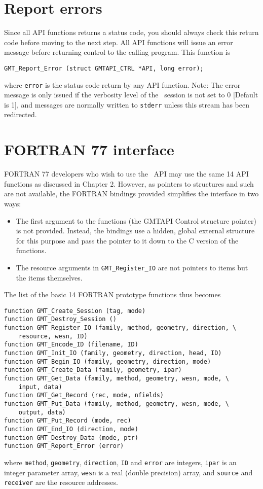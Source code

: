 \documentclass{report}
\begin{document}
\section{Report errors}

Since all API functions returns a status code, you should always check this return code before
moving to the next step.  All API functions will issue an error message before returning control
to the calling program.  This function is

\begin{verbatim}
GMT_Report_Error (struct GMTAPI_CTRL *API, long error);
\end{verbatim}
where \texttt{error} is the status code return by any API function.  Note: The error message is
only issued if the verbosity level of the \GMT\ session is not set to 0 [Default is 1], and
messages are normally written to \texttt{stderr} unless this stream has been redirected.

\section{FORTRAN 77 interface} 

FORTRAN 77 developers who wish to use the \GMT\ API may use the same 14 API functions as discussed in Chapter 2.
However, as pointers to structures and such are not available, the FORTRAN bindings provided simplifies the
interface in two ways:
\begin{itemize}
\item The first argument to the functions (the GMTAPI Control structure pointer) is not provided.  Instead,
the bindings use a hidden, global external structure for this purpose and pass the pointer to it down to
the C version of the functions.
\item The resource arguments in \texttt{GMT\_Register\_IO} are not pointers to
items but the items themselves.
\end{itemize}
The list of the basic 14 FORTRAN prototype functions thus becomes
\begin{verbatim}
function GMT_Create_Session (tag, mode)
function GMT_Destroy_Session ()
function GMT_Register_IO (family, method, geometry, direction, \
    resource, wesn, ID)
function GMT_Encode_ID (filename, ID)
function GMT_Init_IO (family, geometry, direction, head, ID)
function GMT_Begin_IO (family, geometry, direction, mode)
function GMT_Create_Data (family, geometry, ipar)
function GMT_Get_Data (family, method, geometry, wesn, mode, \
	input, data)
function GMT_Get_Record (rec, mode, nfields)
function GMT_Put_Data (family, method, geometry, wesn, mode, \
	output, data)
function GMT_Put_Record (mode, rec)
function GMT_End_IO (direction, mode)
function GMT_Destroy_Data (mode, ptr)
function GMT_Report_Error (error)
\end{verbatim}
where \texttt{method}, \texttt{geometry}, \texttt{direction}, \texttt{ID} and \texttt{error} are integers,
\texttt{ipar} is an integer parameter array, \texttt{wesn} is a real (double precision) array,
and \texttt{source} and \texttt{receiver} are the resource addresses.

\clearpage
\thispagestyle{headings}
\printindex
\thispagestyle{headings}
\end{document}
